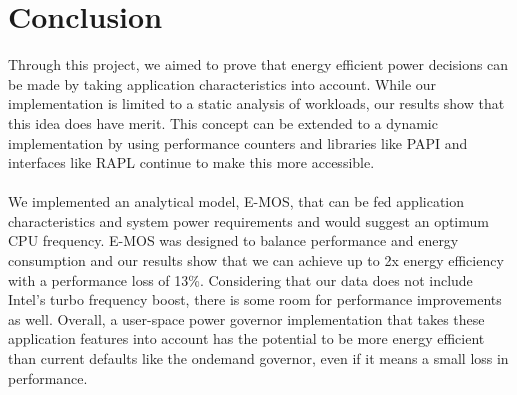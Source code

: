 \section{Conclusion}\label{sec:conc}
Through this project, we aimed to prove that energy efficient power decisions can be made by taking application 
characteristics into account. While our implementation is limited to a static analysis of workloads, our results show that 
this idea does have merit. This concept can be extended to a dynamic implementation by using performance counters and 
libraries like PAPI and interfaces like RAPL continue to make this more accessible. 
\paragraph{}We implemented an analytical model, E-MOS, that can be fed application characteristics and system power requirements 
and would suggest an optimum CPU frequency. E-MOS was designed to balance performance and energy consumption and our 
results show that we can achieve up to 2x energy efficiency with a performance loss of 13\%. Considering that our data 
does not include Intel's turbo frequency boost, there is some room for performance improvements as well.
Overall, a user-space power governor implementation that takes these application features into account has the potential to 
be more energy efficient than current defaults like the ondemand governor, even if it means a small loss in performance.
